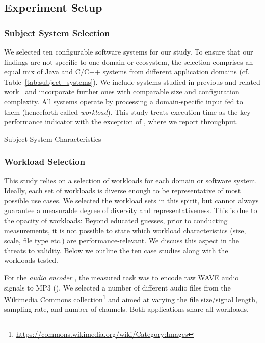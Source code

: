 {
\subsection{Experiment Setup}\label{sec:setup}
\subsubsection{Subject System Selection}
{\color{edited}
We selected ten configurable software systems for our study. To ensure that our findings are not specific to one domain or ecosystem, the selection comprises an equal mix of Java and C/C++ systems from different application domains (cf. Table~\ref{tab:subject_systems}). We include systems studied in previous and related work~\cite{velez_2020_configcrusher_jase,weber_white_2021,alves_sampling_2020} and incorporate further ones with comparable size and configuration complexity. All systems operate by processing a domain-specific input fed to them (henceforth called \textit{workload}). This study treats execution time as the key performance indicator with the exception of \htwo, where we report throughput.

\begin{table}
	\footnotesize
	\centering
	\caption{Subject System Characteristics}
	
	\label{tab:subject_systems}
\end{table}

\subsubsection{Workload Selection}
This study relies on a selection of workloads for each domain or software system. Ideally, each set of workloads is diverse enough to be representative of most possible use cases. We selected the workload sets in this spirit, but cannot always guarantee a measurable degree of diversity and representativeness. This is due to the opacity of workloads: Beyond educated guesses, prior to conducting measurements, it is not possible to state which workload characteristics (size, scale, file type etc.) are performance-relevant. We discuss this aspect in the threats to validity. Below we outline the ten case studies along with the workloads tested. 


For the \textit{audio encoder} \jumper, the measured task was to encode raw WAVE audio signals to MP3 (\jumper). We selected a number of different audio files from the Wikimedia Commons collection\footnote{\url{https://commons.wikimedia.org/wiki/Category:Images}} and aimed at varying the file size/signal length, sampling rate, and number of channels. Both applications share all workloads.

}}
